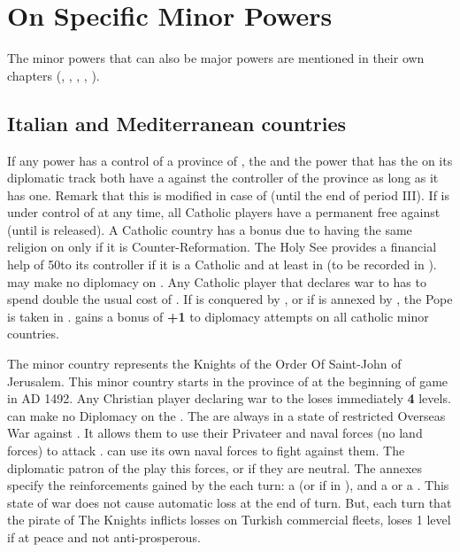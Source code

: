 \section{On Specific Minor Powers}
The minor powers that can also be major powers are mentioned in their
own chapters (, ,
, , ).

\subsection{Italian and Mediterranean countries}\label{chSpecific:Italy}

\label{chSpecific:Papacy}
\aparag If any power has a control of a province of , the
\SDCF and the power that has the  on its diplomatic track
both have a \CB against the controller of the province as long as it has
one.
\bparag Remark that this is modified in case of  (until
the end of period III).
\bparag If  is under control of \TUR at any time, all
Catholic players have a permanent free \CB against \TUR (until
 is released).
\aparag[Diplomacy]
\bparag A Catholic country has a bonus due to having the same religion
on  only if it is Counter-Reformation.
\label{chSpecific:Papacy:Gold} The Holy See provides
a financial help of 50\ducats to its controller if it is a Catholic and
at least in \MA (to be recorded in ).
\bparag \TUR may make no diplomacy on .
\bparag Any Catholic player that declares war to  has to
spend double the usual cost of \STAB.
 If  is conquered by \TUR, or if
 is annexed by \VEN, the Pope is taken in
. \VEN gains a bonus of {\bf +1} to diplomacy attempts on
all catholic minor countries.

\label{chSpecific:Knights}
The  minor country represents the Knights of the Order
Of Saint-John of Jerusalem. This minor country starts in the province of
 at the beginning of game in AD 1492.
\aparag[Diplomacy] Any Christian player declaring war to the
 loses immediately {\bf 4} \STAB levels.
\bparag \TUR can make no Diplomacy on the .
 The  are always in a
state of restricted Overseas War against \TUR.
\bparag It allows them to use their Privateer and naval forces (no land
forces) to attack \TUR. \TUR can use its own naval forces to fight
against them.
\bparag The diplomatic patron of the  play this forces,
or \SPA if they are neutral.
\bparag The annexes specify the reinforcements gained by the
 each turn: a \corsaire\facemoins (or \Faceplus if in
), and a \NGD or a \NDE.
\bparag This state of war does not cause automatic \STAB loss at the end
of turn.  But, each turn that the pirate of The Knights inflicts losses
on Turkish commercial fleets, \TUR loses 1 \STAB level if at peace and
not anti-prosperous.

